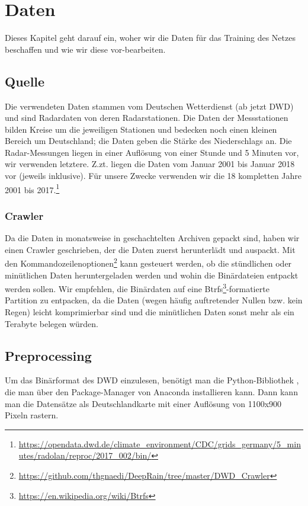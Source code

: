 \section{Daten}
Dieses Kapitel geht darauf ein, woher wir die Daten für das Training des Netzes beschaffen und wie wir diese vor-bearbeiten.

\subsection{Quelle}
Die verwendeten Daten stammen vom Deutschen Wetterdienst (ab jetzt DWD) und sind Radardaten von deren Radarstationen. Die Daten der Messstationen bilden Kreise um die jeweiligen Stationen und bedecken noch einen kleinen Bereich um Deutschland; die Daten geben die Stärke des Niederschlags an. Die Radar-Messungen liegen in einer Auflösung von einer Stunde und 5 Minuten vor, wir verwenden letztere. Z.zt. liegen die Daten vom Januar 2001 bis Januar 2018 vor (jeweils inklusive). Für unsere Zwecke verwenden wir die 18 kompletten Jahre 2001 bis 2017.\footnote{\url{https://opendata.dwd.de/climate\_environment/CDC/grids\_germany/5\_minutes/radolan/reproc/2017\_002/bin/}}

\subsubsection{Crawler}
Da die Daten in monatsweise in geschachtelten Archiven gepackt sind, haben wir einen Crawler geschrieben, der die Daten zuerst herunterlädt und auspackt. Mit den Kommandozeilenoptionen\footnote{\url{https://github.com/thgnaedi/DeepRain/tree/master/DWD_Crawler}} kann gesteuert werden, ob die stündlichen oder minütlichen Daten heruntergeladen werden und wohin die Binärdateien entpackt werden sollen. Wir empfehlen, die Binärdaten auf eine Btrfs\footnote{\url{https://en.wikipedia.org/wiki/Btrfs}}-formatierte Partition zu entpacken, da die Daten (wegen häufig auftretender Nullen bzw. kein Regen) leicht komprimierbar sind und die minütlichen Daten sonst mehr als ein Terabyte belegen würden.

\subsection{Preprocessing}
Um das Binärformat des DWD einzulesen, benötigt man die Python-Bibliothek , die man über den Package-Manager von Anaconda installieren kann. Dann kann man die Datensätze als Deutschlandkarte mit einer Auflösung von 1100x900 Pixeln rastern.

